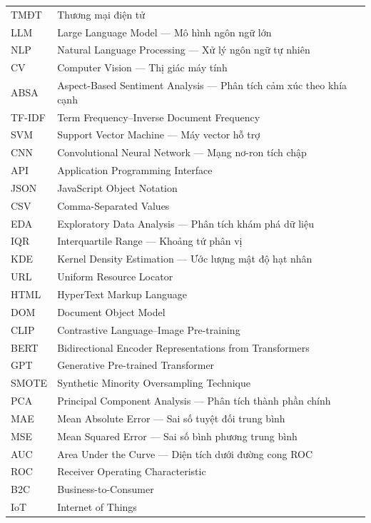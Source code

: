\documentclass[oneside]{hcmus-report}
\begin{document}
\begin{longtable}{p{} p{}}
TMĐT       & Thương mại điện tử \\
LLM        & Large Language Model --- Mô hình ngôn ngữ lớn \\
NLP        & Natural Language Processing --- Xử lý ngôn ngữ tự nhiên \\
CV         & Computer Vision --- Thị giác máy tính \\
ABSA       & Aspect-Based Sentiment Analysis --- Phân tích cảm xúc theo khía cạnh \\
TF-IDF     & Term Frequency--Inverse Document Frequency \\
SVM        & Support Vector Machine --- Máy vector hỗ trợ \\
CNN        & Convolutional Neural Network --- Mạng nơ-ron tích chập \\
API        & Application Programming Interface \\
JSON       & JavaScript Object Notation \\
CSV        & Comma-Separated Values \\
EDA        & Exploratory Data Analysis --- Phân tích khám phá dữ liệu \\
IQR        & Interquartile Range --- Khoảng tứ phân vị \\
KDE        & Kernel Density Estimation --- Ước lượng mật độ hạt nhân \\
URL        & Uniform Resource Locator \\
HTML       & HyperText Markup Language \\
DOM        & Document Object Model \\
CLIP       & Contrastive Language--Image Pre-training \\
BERT       & Bidirectional Encoder Representations from Transformers \\
GPT        & Generative Pre-trained Transformer \\
SMOTE      & Synthetic Minority Oversampling Technique \\
PCA        & Principal Component Analysis --- Phân tích thành phần chính \\
MAE        & Mean Absolute Error --- Sai số tuyệt đối trung bình \\
MSE        & Mean Squared Error --- Sai số bình phương trung bình \\
AUC        & Area Under the Curve --- Diện tích dưới đường cong ROC \\
ROC        & Receiver Operating Characteristic \\
B2C        & Business-to-Consumer \\
IoT        & Internet of Things \\

\end{longtable}
\end{document}
